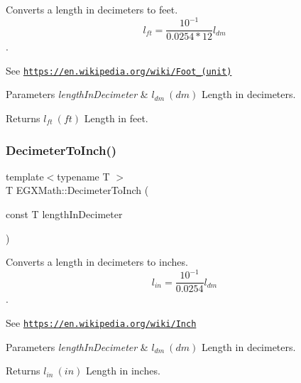 Converts a length in decimeters to feet. \[ l_{ft}= \frac{10^{-1}}{0.0254 * 12} l_{dm} \]. 

See \href{https://en.wikipedia.org/wiki/Foot_(unit)}{\tt https\+://en.\+wikipedia.\+org/wiki/\+Foot\+\_\+(unit)} 
\begin{DoxyParams}{Parameters}
{\em length\+In\+Decimeter} & $ l_{dm}\ (dm)$ Length in decimeters. \\
\hline
\end{DoxyParams}
\begin{DoxyReturn}{Returns}
$ l_{ft}\ (ft)$ Length in feet. 
\end{DoxyReturn}
\mbox{\label{group___e_g_x_math-_conversions-_length_conversions-_decimeter-_imperial_ga51bb6347b1c3ca746b7a3eadc3852e37}} 
\subsubsection{\texorpdfstring{Decimeter\+To\+Inch()}{DecimeterToInch()}}
{\footnotesize\ttfamily template$<$typename T $>$ \\
T E\+G\+X\+Math\+::\+Decimeter\+To\+Inch (\begin{DoxyParamCaption}\item[{const T}]{length\+In\+Decimeter }\end{DoxyParamCaption})}



Converts a length in decimeters to inches. \[ l_{in}= \frac{10^{-1}}{0.0254} l_{dm} \]. 

See \href{https://en.wikipedia.org/wiki/Inch}{\tt https\+://en.\+wikipedia.\+org/wiki/\+Inch} 
\begin{DoxyParams}{Parameters}
{\em length\+In\+Decimeter} & $ l_{dm}\ (dm)$ Length in decimeters. \\
\hline
\end{DoxyParams}
\begin{DoxyReturn}{Returns}
$ l_{in}\ (in)$ Length in inches. 
\end{DoxyReturn}
\mbox{\label{group___e_g_x_math-_conversions-_length_conversions-_decimeter-_imperial_gad2ce3f2de1fdda0216bdb56c4844b5e5}} 
